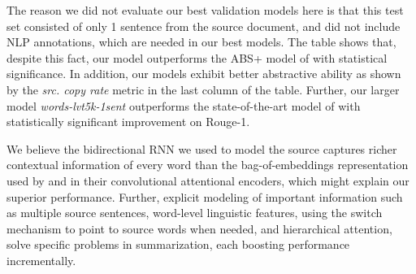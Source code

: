 The reason we did not evaluate our best validation models here is that this test set consisted of only 1 sentence from the source document, and did not include NLP annotations, which are needed in our best models. The table shows that, despite this fact, our model outperforms the ABS+ model of  with statistical significance. In addition, our models exhibit better abstractive ability as shown by the {\it src. copy rate} metric in the last column of the table. Further, our larger model {\it words-lvt5k-1sent} outperforms the state-of-the-art model of \cite{chopra} with statistically significant improvement on Rouge-1. 

We believe the bidirectional RNN we used to model the source captures richer contextual information of every word than the bag-of-embeddings representation used by  and  in their convolutional attentional encoders, which might explain our superior performance. %
Further, explicit modeling of important information such as multiple source sentences, word-level linguistic features, using the switch mechanism to point to source words when needed, and hierarchical attention, solve specific problems in summarization, each boosting performance incrementally. 



